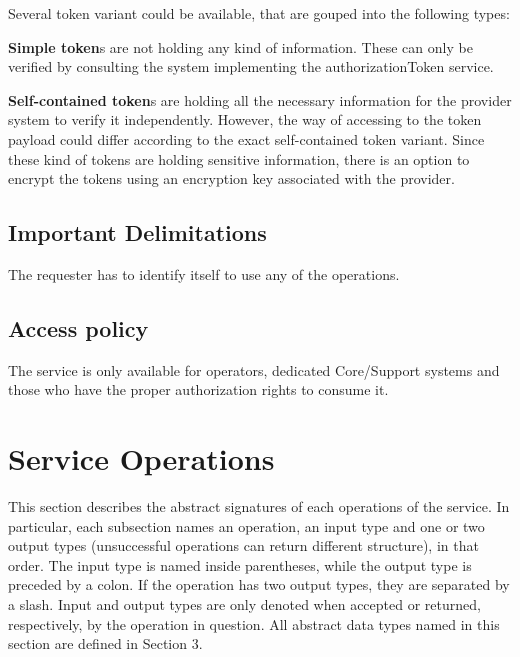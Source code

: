 \documentclass[a4paper]{arrowhead}
\begin{document}
Several token variant could be available, that are gouped into the following types:

\textbf{Simple token}s are not holding any kind of information. These can only be verified by consulting the system implementing the authorizationToken service.

\textbf{Self-contained token}s are holding all the necessary information for the provider system to verify it independently. However, the way of accessing to the token payload could differ according to the exact self-contained token variant. Since these kind of tokens are holding sensitive information, there is an option to encrypt the tokens using an encryption key associated with the provider.

\subsection{Important Delimitations}
\label{sec:delimitations}

The requester has to identify itself to use any of the operations.

\subsection{Access policy}
\label{sec:accesspolicy}

The service is only available for operators, dedicated Core/Support systems and those who have the proper
authorization rights to consume it.

\newpage

\section{Service Operations}
\label{sec:functions}

This section describes the abstract signatures of each operations of the service. In particular, each subsection names an operation, an input type and one or two output types (unsuccessful operations can return different structure), in that order.
The input type is named inside parentheses, while the output type is preceded by a colon. If the operation has two output types, they are separated by a slash.
Input and output types are only denoted when accepted or returned, respectively, by the operation in question. All abstract data types named in this section are defined in Section 3.

{}
\end{document}
